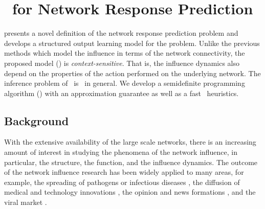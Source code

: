 {%
%
\section{\spin\ for Network Response Prediction} \label{sc_su14a}

 presents a novel definition of the network response prediction problem and develops a structured output learning model for the problem.
Unlike the previous methods which model the influence in terms of the network connectivity, the proposed model (\spin) is \textit{context-sensitive}. 
That is, the influence dynamics also depend on the properties of the action performed on the underlying network.
The inference problem of \spin\ is \nphard\ in general.
We develop a semidefinite programming algorithm (\sdp) with an approximation guarantee as well as a fast \greedy\ heuristics.

\subsection{Background}

With the extensive availability of the large scale networks, there is an increasing amount of interest in studying the phenomena of the network influence, in particular, the structure, the function, and the influence dynamics. 
The outcome of the network influence research has been widely applied to many areas, for example, the spreading of pathogens or infectious diseases \citep{Hethcote00the,Anderson02infectious}, the diffusion of medical and technology innovations \citep{Strang98diffusion,Rogers03the}, the opinion and news formations \citep{Adar04implicit,Gruhl04information,Adar05tracking,Leskovec07cascading,Nowell08tracing,Leskovec09meme}, and the viral market \citep{Domingos01mining,Kempe03maximizing,Liben-Nowell03the}.

}
